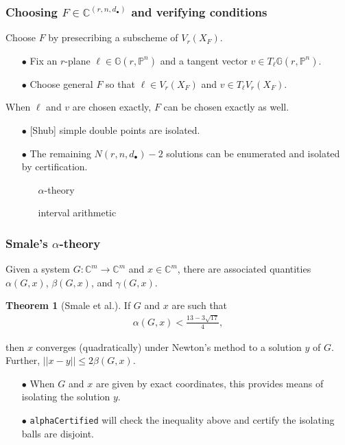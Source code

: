 \documentclass{beamer}
\theoremstyle{definition}
\newtheorem{thm}{Theorem}
\begin{document}
\begin{frame}
\frametitle{Choosing $F\in\mathbb{C}^{(r,n,d_\bullet)}$ and verifying conditions}
Choose $F$ by presecribing a subscheme of $V_r(X_F)$.
\begin{enumerate}
\item[$\bullet$] Fix an $r$-plane $\ell\in\mathbb{G}(r,\mathbb{P}^n)$ and a tangent vector $v\in T_\ell\mathbb{G}(r,\mathbb{P}^n)$. 

\item[$\bullet$] Choose general $F$ so that $\ell\in V_r(X_F)$ and $v\in T_\ell V_r(X_F)$.
\end{enumerate}

When $\ell$ and $v$ are chosen exactly, $F$ can be chosen exactly as well.
\begin{enumerate}
\item[$\bullet$] [Shub] simple double points are isolated.

\item[$\bullet$] The remaining $N(r,n,d_\bullet)-2$ solutions can be enumerated and isolated by certification.
\begin{enumerate}
\item[\scalebox{.7}{$\blacksquare$}] $\alpha$-theory

\item[\scalebox{.7}{$\blacksquare$}] interval arithmetic
\end{enumerate}
\end{enumerate}




\end{frame}






\begin{frame}
\frametitle{Smale's $\alpha$-theory}
Given a system $G:\mathbb{C}^m\to\mathbb{C}^m$ and $x\in\mathbb{C}^m$, there are associated quantities $\alpha(G,x)$, $\beta(G,x)$, and $\gamma(G,x)$. 

\begin{thm}[Smale et al.]
\vspace{-.1cm}
If $G$ and $x$ are such that
\vspace{-.2cm}
\begin{align*}
\alpha(G,x) < \frac{13-3\sqrt{17}}{4},
\end{align*}
\vspace{-.85cm}

then $x$ converges (quadratically) under Newton's method to a solution $y$ of $G$. Further, $||x-y||\le 2\beta(G,x)$.
\end{thm}

\begin{enumerate}
\item[$\bullet$] When $G$ and $x$ are given by exact coordinates, this provides means of isolating the solution $y$. 

\item[$\bullet$] \texttt{alphaCertified} will check the inequality above and certify the isolating balls are disjoint. 
\end{enumerate}
\end{frame}
\end{document}
